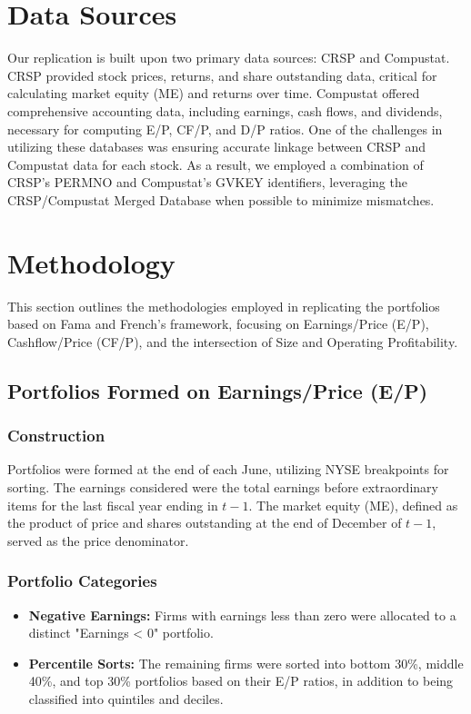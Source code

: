 \documentclass{article}
\begin{document}
\section*{Data Sources}

Our replication is built upon two primary data sources: CRSP and Compustat. CRSP provided stock prices, returns, and share outstanding data, critical for calculating market equity (ME) and returns over time. Compustat offered comprehensive accounting data, including earnings, cash flows, and dividends, necessary for computing E/P, CF/P, and D/P ratios. One of the challenges in utilizing these databases was ensuring accurate linkage between CRSP and Compustat data for each stock. As a result, we employed a combination of CRSP’s PERMNO and Compustat’s GVKEY identifiers, leveraging the CRSP/Compustat Merged Database when possible to minimize mismatches. 

\section*{Methodology}

This section outlines the methodologies employed in replicating the portfolios based on Fama and French's framework, focusing on Earnings/Price (E/P), Cashflow/Price (CF/P), and the intersection of Size and Operating Profitability.

\subsection*{Portfolios Formed on Earnings/Price (E/P)}

\subsubsection*{Construction}

Portfolios were formed at the end of each June, utilizing NYSE breakpoints for sorting. The earnings considered were the total earnings before extraordinary items for the last fiscal year ending in $t-1$. The market equity (ME), defined as the product of price and shares outstanding at the end of December of $t-1$, served as the price denominator.

\subsubsection*{Portfolio Categories}

\begin{itemize}
    \item \textbf{Negative Earnings:} Firms with earnings less than zero were allocated to a distinct "Earnings < 0" portfolio.
    \item \textbf{Percentile Sorts:} The remaining firms were sorted into bottom 30\%, middle 40\%, and top 30\% portfolios based on their E/P ratios, in addition to being classified into quintiles and deciles.
\end{itemize}
\end{document}
